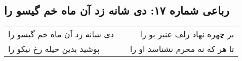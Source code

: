 \begin{center}
\section*{رباعی شماره ۱۷: دی شانه زد آن ماه خم گیسو را}
\label{sec:sh017}
\begin{longtable}{l p{0.5cm} r}
دی شانه زد آن ماه خم گیسو را
&&
بر چهره نهاد زلف عنبر بو را
\\
پوشید بدین حیله رخ نیکو را
&&
تا هر که نه محرم نشناسد او را
\\
\end{longtable}
\end{center}
